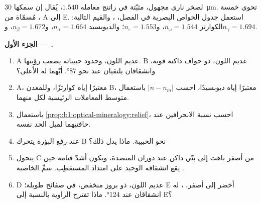 \begin{problem}
\label{pb:b1:optical-mineralogy:1}
 لصخر ناري مجهول، مثبّتة في راتنج معامله $1.540$، يُقال إن سمكها \qty{30}{\micro m}. تحوي خمسة ، مُسمّاة من A إلى E. استعمل جدول الخواص البصرية في الفصل، ، والقيم التالية: الكوارتز $n_\omega = 1.544$، و$n_\varepsilon = 1.553$؛ والديوبسيد $n_\alpha = 1.664$، و$n_\beta = 1.672$، و$n_\gamma = 1.694$.

\medskip
\noindent\textbf{الجزء الأول --- .}
\begin{enumerate}
  \item {} A عديم اللون، وحدود حبيباته يصعب رؤيتها.  B عديم اللون، ذو حواف داكنة قوية، وانشقاقان يلتقيان عند
        نحو \ang{87}. أيّهما له  الأعلى؟
  \item {} A، معتبرًا إياه كوارتزًا، وللمعدن B، معتبرًا إياه ديوبسيدًا، احسب $|n - n_m|$ باستعمال متوسط المعاملات الرئيسية لكل منهما.
  \item باستعمال \cref{prop:b1:optical-mineralogy:relief}، احسب نسبة الانحرافين عند حافتيهما لميل الحد نفسه.
  \item عند رفع البؤرة يتحرك   B نحو الحبيبة. ماذا يدل ذلك؟
  \item يتحول  C من أصفر باهت إلى بنّي داكن عند دوران المنضدة، ويكون أشدّ قتامة حين يقع انشقاقه الوحيد على امتداد المستقطِب. سمِّ الخاصية .
  \item {} D عديم اللون، ذو بروز منخفض، في صفائح طويلة؛  E أخضر إلى أصفر، ، له انشقاقان عند \ang{124}. ماذا تقترح الزاوية بالنسبة إلى E؟
\end{enumerate}


\end{problem}
